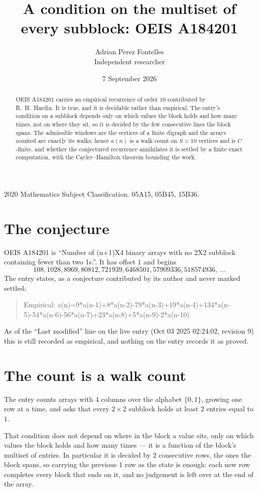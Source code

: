 \documentclass[11pt,a4paper]{article}
\title{A condition on the multiset of every subblock: OEIS A184201}
\author{Adrian Perez Fontelles\\ \small Independent researcher}
\date{7 September 2026}
\theoremstyle{plain}
\theoremstyle{definition}
\begin{document}
\maketitle

\begin{abstract}
OEIS A184201 carries an empirical recurrence of order $10$ contributed by R.~H.~Hardin. It is
true, and it is decidable rather than empirical. The entry's condition on a subblock depends
only on which values the block holds and how many times, not on where they sit, so it is
decided by the few consecutive lines the block spans. The admissible windows are the vertices
of a finite digraph and the arrays counted are exactly its walks; hence $a(n)$ is a walk count
on $S=10$ vertices and is $C$-finite, and whether the conjectured recurrence annihilates it
is settled by a finite exact computation, with the Cayley--Hamilton theorem bounding the
work.
\end{abstract}

\noindent\small 2020 Mathematics Subject Classification. 05A15, 05B45, 15B36.\normalsize

\section{The conjecture}

OEIS A184201 is ``Number of (n+1)X4 binary arrays with no 2X2 subblock containing fewer than two 1s.''. It has offset $1$ and begins
\[
108, 1028, 8969, 80812, 721939, 6468501, 57909336, 518574936,\ \dots
\]
The entry states, as a conjecture contributed by its author and never marked settled:
\begin{quote}
Empirical: a(n)=9*a(n-1)+8*a(n-2)-79*a(n-3)+19*a(n-4)+134*a(n-5)-54*a(n-6)-56*a(n-7)+23*a(n-8)+5*a(n-9)-2*a(n-10)
\end{quote}
As of the ``Last modified'' line on the live entry (Oct 03 2025 02:24:02, revision 9) this is still
recorded as empirical, and nothing on the entry records it as proved.

\section{The count is a walk count}

The entry counts arrays with $4$ columns over the alphabet $\{0,1\}$, growing one row at a time, and asks that every $2\times2$ subblock holds at least $2$ entries equal to $1$.

That condition does not depend on where in the block a value sits, only on which values the block holds and how many times --- it is a function of the block's multiset of entries. In particular it is decided by $2$ consecutive rows, the ones the block spans, so carrying the previous $1$ row as the state is enough: each new row completes every block that ends on it, and no judgement is left over at the end of the array.
\end{document}
